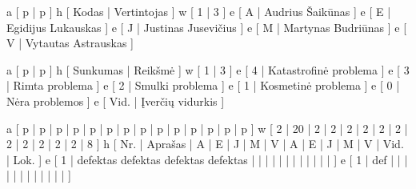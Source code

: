 \xtableu
{
  a [ p | p ]
  h [ Kodas | Vertintojas ]
  w [ 1 | 3 ]
  e [ A | Audrius Šaikūnas ]
  e [ E | Egidijus Lukauskas ]
  e [ J | Justinas Jusevičius ]
  e [ M | Martynas Budriūnas ]
  e [ V | Vytautas Astrauskas ]
}

\xtableu
{
  a [ p | p ]
  h [ Sunkumas | Reikšmė ]
  w [ 1 | 3 ]
  e [ 4 | Katastrofinė problema ]
  e [ 3 | Rimta problema ]
  e [ 2 | Smulki problema ]
  e [ 1 | Kosmetinė problema ]
  e [ 0 | Nėra problemos ]
  e [ Vid. | Įverčių vidurkis ]
}

\xtableu
{
  a [ p   | p       | p | p | p | p | p | p | p | p | p | p | p    | p ]
  w [ 2   | 20      | 2 | 2 | 2 | 2 | 2 | 2 | 2 | 2 | 2 | 2 | 2    | 8 ]
  h [ Nr. | Aprašas | A | E | J | M | V | A | E | J | M | V | Vid. | Lok. ]
  e [ 1   | defektas defektas defektas defektas  
                    |   |   |   |   |   |   |   |   |   |   |      |      ]
  e [ 1   | def     
                    |   |   |   |   |   |   |   |   |   |   |      |      ]
}

